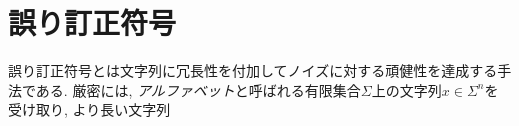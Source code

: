 \chapter{誤り訂正符号} \label{chap:error-correcting code}
誤り訂正符号とは文字列に冗長性を付加してノイズに対する頑健性を達成する手法である.
厳密には, \emph{アルファベット}と呼ばれる有限集合$\Sigma$上の文字列$x \in \Sigma^n$を受け取り, より長い文字列